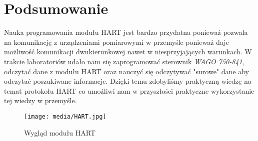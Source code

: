 \documentclass{article}
\begin{document}
\newpage
\section{Podsumowanie}
Nauka programowania modułu HART jest bardzo przydatna ponieważ pozwala na komunikację z urządzeniami pomiarowymi w przemyśle ponieważ daje możliwość komunikacji dwukierunkowej nawet w niesprzyjających warunkach. W trakcie laboratoriów udało nam się zaprogramować sterownik \textit{WAGO 750-841}, odczytać dane z modułu HART oraz nauczyć się odczytywać "surowe" dane aby odczytać poszukiwane informacje. Dzięki temu zdobyliśmy praktyczną wiedzę na temat protokołu HART co umożliwi nam w przyszłości praktyczne wykorzystanie tej wiedzy w przemyśle.
\vspace{1em}
\begin{figure}[H]
    \centering
    \texttt{[image: media/HART.jpg]}
    \caption{Wygląd modułu HART}
\end{figure}
\end{document}
